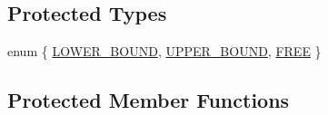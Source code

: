 \subsection*{Protected Types}
\begin{DoxyCompactItemize}
\item 
enum \{ \hyperlink{class_s_v_m289___m_f_s_1_1_solver_a4506ce05fd214117bf4cd7b5a1022891a3560e8cd775e776b3e97f758b60063fc}{L\+O\+W\+E\+R\+\_\+\+B\+O\+U\+ND}, 
\hyperlink{class_s_v_m289___m_f_s_1_1_solver_a4506ce05fd214117bf4cd7b5a1022891aae94fa8d765e599e06a849ac9c075196}{U\+P\+P\+E\+R\+\_\+\+B\+O\+U\+ND}, 
\hyperlink{class_s_v_m289___m_f_s_1_1_solver_a4506ce05fd214117bf4cd7b5a1022891a63bed4b4d9335c1291bef6c08dea90ea}{F\+R\+EE}
 \}
\end{DoxyCompactItemize}
\subsection*{Protected Member Functions}
